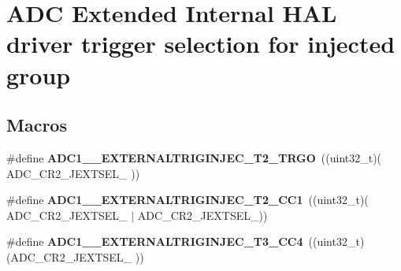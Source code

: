 \hypertarget{group___a_d_c_ex___internal___h_a_l__driver___ext__trig__src___injected}{}\section{A\+DC Extended Internal H\+AL driver trigger selection for injected group}
\label{group___a_d_c_ex___internal___h_a_l__driver___ext__trig__src___injected}
\subsection*{Macros}
\begin{DoxyCompactItemize}
\item 
\mbox{\label{group___a_d_c_ex___internal___h_a_l__driver___ext__trig__src___injected_ga10a18ee99da1c79b43c2ce9b172056ae}} 
\#define {\bfseries A\+D\+C1\+\_\+\_\+\+E\+X\+T\+E\+R\+N\+A\+L\+T\+R\+I\+G\+I\+N\+J\+E\+C\+\_\+\+T2\+\_\+\+T\+R\+GO}~((uint32\+\_\+t)(                    A\+D\+C\+\_\+\+C\+R2\+\_\+\+J\+E\+X\+T\+S\+E\+L\+\_                    ))
\item 
\mbox{\label{group___a_d_c_ex___internal___h_a_l__driver___ext__trig__src___injected_ga3427be16224e622119dd542832bbe27b}} 
\#define {\bfseries A\+D\+C1\+\_\+\_\+\+E\+X\+T\+E\+R\+N\+A\+L\+T\+R\+I\+G\+I\+N\+J\+E\+C\+\_\+\+T2\+\_\+\+C\+C1}~((uint32\+\_\+t)(                    A\+D\+C\+\_\+\+C\+R2\+\_\+\+J\+E\+X\+T\+S\+E\+L\+\_ $\vert$ A\+D\+C\+\_\+\+C\+R2\+\_\+\+J\+E\+X\+T\+S\+E\+L\+\_))
\item 
\mbox{\label{group___a_d_c_ex___internal___h_a_l__driver___ext__trig__src___injected_gafa35c43b8f76134bd3309c77b2895050}} 
\#define {\bfseries A\+D\+C1\+\_\+\_\+\+E\+X\+T\+E\+R\+N\+A\+L\+T\+R\+I\+G\+I\+N\+J\+E\+C\+\_\+\+T3\+\_\+\+C\+C4}~((uint32\+\_\+t)(A\+D\+C\+\_\+\+C\+R2\+\_\+\+J\+E\+X\+T\+S\+E\+L\+\_                                        ))
\item 
\mbox{\label{group___a_d_c_ex___internal___h_a_l__driver___ext__trig__src___injected_ga23e7fe91ecea2d7c2b287fe80d1a3ae8}} 

\end{DoxyCompactItemize}

